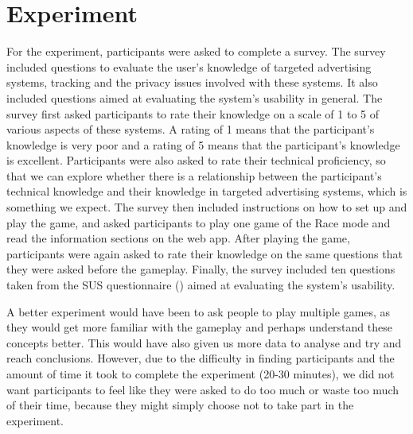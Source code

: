 \documentclass{l4proj}
\begin{document}
\section{Experiment}
For the experiment, participants were asked to complete a survey. The survey included questions to evaluate the user's knowledge of targeted advertising systems, tracking and the privacy issues involved with these systems. It also included questions aimed at evaluating the system's usability in general. The survey first asked participants to rate their knowledge on a scale of 1 to 5 of various aspects of these systems. A rating of 1 means that the participant's knowledge is very poor and a rating of 5 means that the participant's knowledge is excellent. Participants were also asked to rate their technical proficiency, so that we can explore whether there is a relationship between the participant's technical knowledge and their knowledge in targeted advertising systems, which is something we expect. The survey then included instructions on how to set up and play the game, and asked participants to play one game of the Race mode and read the information sections on the web app. After playing the game, participants were again asked to rate their knowledge on the same questions that they were asked before the gameplay. Finally, the survey included ten questions taken from the SUS questionnaire (\cite{sus}) aimed at evaluating the system's usability.

A better experiment would have been to ask people to play multiple games, as they would get more familiar with the gameplay and perhaps understand these concepts better. This would have also given us more data to analyse and try and reach conclusions. However, due to the difficulty in finding participants and the amount of time it took to complete the experiment (20-30 minutes), we did not want participants to feel like they were asked to do too much or waste too much of their time, because they might simply choose not to take part in the experiment.
\end{document}
